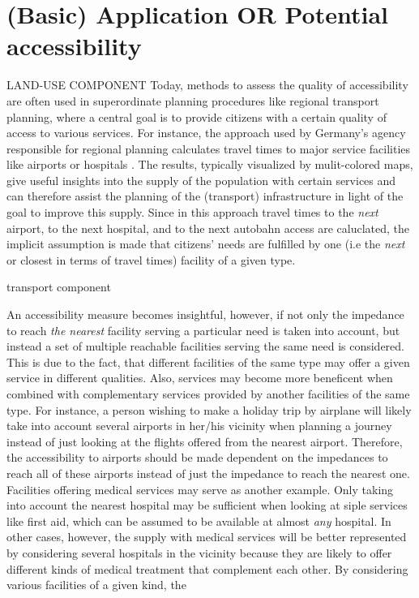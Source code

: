 \section{(Basic) Application OR Potential accessibility} LAND-USE COMPONENT
Today, methods to assess the quality of accessibility
are often used in superordinate planning procedures like regional transport planning, where a central goal is to provide 
citizens with a certain quality of access to various services. For instance, the approach used by Germany's agency 
responsible for regional planning calculates travel times to major service facilities like airports or hospitals \citep{BBSR20xxErreichbarkeitsmodell}. %
The results, typically visualized by mulit-colored maps, give useful insights into the supply of the population with 
certain services and can therefore assist the planning of the (transport) infrastructure in light of the goal to improve 
this supply. Since in this approach travel times to the \textit{next} airport, to the next hospital, and to the next 
autobahn access are caluclated, the implicit assumption is made that citizens' needs are fulfilled by one (i.e the \textit{next} 
or closest in terms of travel times) facility of a given type.

transport component

An accessibility measure becomes insightful, however, if not only the impedance to reach \textit{the nearest} facility 
serving a particular need is taken into account, but instead a set of multiple reachable facilities serving the same 
need is considered. This is due to the fact, that different facilities of the same type may offer a given service in 
different qualities. Also, services may become more beneficent when combined with complementary services provided by 
another facilities of the same type. For instance, a person wishing to make a holiday trip by airplane will likely 
take into account several airports in her/his vicinity when planning a journey instead of just looking at the flights 
offered from the nearest airport. Therefore, the accessibility to airports should be made dependent on the impedances 
to reach all of these airports instead of just the impedance to reach the nearest one. Facilities offering medical 
services may serve as another example. Only taking into account the nearest hospital may be sufficient when looking 
at siple services like first aid, which can be assumed to be available at almost \textit{any} hospital. In other cases, 
however, the supply with medical services will be better represented by considering several hospitals in the vicinity 
because they are likely to offer different kinds of medical treatment that complement each other. By considering various 
facilities of a given kind, the 


